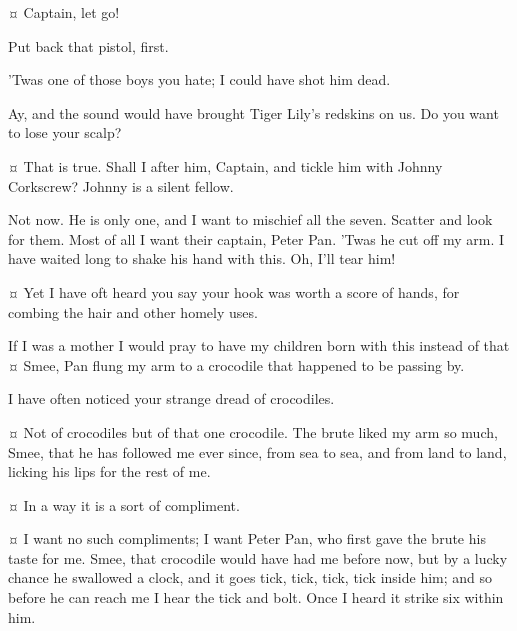 \begin{drama}

\starkeyspeaks {}¤
Captain, let go!

\hookspeaks
Put back that pistol, first.

\starkeyspeaks
’Twas one of those boys you hate; I could have shot him dead.

\hookspeaks
Ay, and the sound would have brought Tiger Lily’s redskins on us.
Do you want to lose your scalp?

\smeespeaks {}¤
That is true.
Shall I after him, Captain, and tickle him with Johnny Corkscrew?
Johnny is a silent fellow.

\hookspeaks
Not now.
He is only one, and I want to mischief all the seven.
Scatter and look for them.
Most of all I want their captain, Peter Pan.
’Twas he cut off my arm.
I have waited long to shake his hand with this.
Oh, I'll tear him!

\smeespeaks {}¤
Yet I have oft heard you say your hook was worth a score of hands, for combing the hair and other homely uses.

\hookspeaks
If I was a mother I would pray to have my children born with this instead of that
¤
Smee, Pan flung my arm to a crocodile that happened to be passing by.

\smeespeaks
I have often noticed your strange dread of crocodiles.

\hookspeaks {}¤
Not of crocodiles but of that one crocodile.
The brute liked my arm so much, Smee, that he has followed me ever since, from sea to sea, and from land to land, licking his lips for the rest of me.

\smeespeaks {}¤
In a way it is a sort of compliment.

\hookspeaks {}¤
I want no such compliments; I want Peter Pan, who first gave the brute his taste for me.
Smee, that crocodile would have had me before now, but by a lucky chance he swallowed a clock, and it goes tick, tick, tick, tick inside him; and so before he can reach me I hear the tick and bolt.
Once I heard it strike six within him.


\end{drama}
